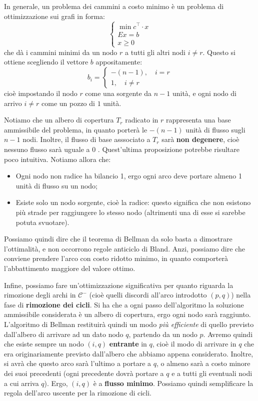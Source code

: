 \documentclass[a4paper,11pt]{article}
\begin{document}
In generale, un problema dei cammini a costo minimo è un problema di ottimizzazione sui grafi in forma:
\[
	\begin{cases}
		\min c^\intercal \cdot x \\
		Ex = b \\ 
		x \geq 0
	\end{cases}
\]
che dà i cammini minimi da un nodo $r$ a tutti gli altri nodi $i \neq r$.
Questo si ottiene scegliendo il vettore $b$ appositamente:
\[
	b_i =
	\begin{cases}
		-(n - 1), \quad i = r \\ 
		1, \quad i \neq r
	\end{cases}
\]
cioè impostando il nodo $r$ come una sorgente da $n-1$ unità, e ogni nodo di arrivo $i \neq r$ come un pozzo di $1$ unità.

Notiamo che un albero di copertura $T_r$ radicato in $r$ rappresenta una base ammissibile del problema, in quanto porterà le $-(n-1)$ unità di flusso sugli $n-1$ nodi.
Inoltre, il flusso di base asssociato a $T_r$ sarà \textbf{non degenere}, cioè nessuno flusso sarà uguale a 0 .
Quest'ultima proposizione potrebbe risultare poco intuitiva.
Notiamo allora che:
\begin{itemize}
	\item Ogni nodo non radice ha bilancio 1, ergo ogni arco deve portare almeno 1 unità di flusso su un nodo;
	\item Esiste solo un nodo sorgente, cioè la radice: questo significa che non esistono più strade per raggiungere lo stesso nodo (altrimenti una di esse si sarebbe potuta svuotare).
\end{itemize}
Possiamo quindi dire che il teorema di Bellman da solo basta a dimostrare l'ottimalità, e non occorrono regole anticiclo di Bland.
Anzi, possiamo dire che conviene prendere l'arco con costo ridotto minimo, in quanto comporterà l'abbattimento maggiore del valore ottimo.

Infine, possiamo fare un'ottimizzazione significativa per quanto riguarda la rimozione degli archi in $\mathcal{C}^-$ (cioè quelli discordi all'arco introdotto $(p,q)$) nella fase di \textbf{rimozione dei cicli}.
Si ha che a ogni passo dell'algoritmo la soluzione ammissibile considerata è un albero di copertura, ergo ogni nodo sarà raggiunto.
L'algoritmo di Bellman restituirà quindi un modo \textit{più efficiente} di quello previsto dall'albero di arrivare ad un dato nodo $q$, partendo da un nodo $p$.
Avremo quindi che esiste sempre un nodo $(i,q)$ \textbf{entrante} in $q$, cioè il modo di arrivare in $q$ che era originariamente previsto dall'albero che abbiamo appena considerato.
Inoltre, si avrà che questo arco sarà l'ultimo a portare a $q$, o almeno sarà a costo minore dei suoi precedenti (ogni precedente dovrà portare a $q$ e a tutti gli eventuali nodi a cui arriva $q$).
Ergo, $(i, q)$ è a \textbf{flusso minimo}.
Possiamo quindi semplificare la regola dell'arco uscente per la rimozione di cicli.
\end{document}
